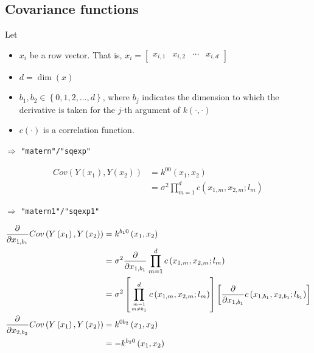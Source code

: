 \documentclass{sfuthesis}
\begin{document}
\subsection{Covariance functions}

Let 
\begin{itemize}
  \item $x_i$ be a row vector. That is,  
  ${x_i} = \left[ {\begin{array}{*{20}{c}}
{{x_{ {i,1} }}}&{{x_{ {i,2} }}}& \cdots &{{x_{ {i,d} }}}
\end{array}} \right]$ 
  \item $d = \dim(x)$
  \item $b_1, b_2 \in \left\{ {0,1,2,...,d} \right\}$, where $b_j$ indicates the dimension to which the derivative is taken for the $j$-th argument of $k(\cdot, \cdot)$
  \item $c(\cdot)$ is a correlation function. 
\end{itemize}

\bigskip
{} $\Rightarrow$ \texttt{"matern"/"sqexp"} 

\begin{align}
  Cov\left( {Y\left( {{x_1}} \right),Y\left( {{x_2}} \right)} \right) &= {k^{00}}\left( {{x_1},{x_2}} \right)\\
 &= {\sigma ^2}\prod\limits_{m = 1}^d {c\left( {{x_{ {1,m} }},{x_{{2,m} }};{l_m}} \right)}
\end{align}

\bigskip
{} $\Rightarrow$ \texttt{"matern1"/"sqexp1"}

\begin{align}
  \frac{\partial }{{\partial {x_{ {1,b_1}}}}}Cov\left( {Y\left( {{x_1}} \right),Y\left( {{x_2}} \right)} \right) &= {k^{b_1 0}}\left( {{x_1},{x_2}} \right)\\
 &= {\sigma ^2}\frac{\partial }{{\partial {x_{ {1, b_1} }}}}\prod\limits_{m = 1}^d {c\left( {{x_{ {1,m} }},{x_{ {2,m} }};{l_m}} \right)} \\
 &= {\sigma ^2}\left[ {\prod\limits_{m = 1\atop
m \ne b_1}^d {c\left( {{x_{ {1,m} }},{x_{ {2,m} }};{l_m}} \right)} } \right]\left[ {\frac{\partial }{{\partial {x_{ {1, b_1} }}}}c\left( {{x_{ {1,b_1} }},{x_{ {2,b_1} }};{l_{b_1} }} \right)} \right]\\
\frac{\partial }{{\partial {x_{ {2,b_2} }}}}Cov\left( {Y\left( {{x_1}} \right),Y\left( {{x_2}} \right)} \right) &= {k^{0 b_2}}\left( {{x_1},{x_2}} \right)\\
 &=  - {k^{b_20}}\left( {{x_1},{x_2}} \right)
\end{align}
\end{document}
